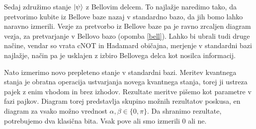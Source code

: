 \documentclass[mat1]{fmfdelo}
\begin{document}
Sedaj združimo stanje \(\ket{\psi}\) z Bellovim delcem. To najlažje naredimo tako, da pretvorimo kubite iz Bellove baze nazaj v standardno bazo, da jih bomo lahko naravno izmerili. Vezje za pretvorbo iz Bellove baze pa je ravno zrcaljen diagram vezja, za pretvarjanje v Bellovo bazo (opomba \ref{bell}). Lahko bi ubrali tudi druge načine, vendar so vrata \textsf{cNOT} in Hadamard običajna, merjenje v standardni bazi najlažje, način pa je usklajen z izbiro Bellovega delca kot nosilca informacij.
\begin{center}
\end{center}
Nato izmerimo novo prepleteno stanje v standardni bazi. Meritev kvantnega stanja je obratna operacija ustvarjanja novega kvantnega stanja, torej ji ustreza pajek z enim vhodom in brez izhodov. Rezultate meritve pišemo kot parametre v fazi pajkov. Diagram torej predstavlja skupino možnih rezultatov poskusa, en diagram za vsako možno vrednost \(\alpha,\beta\in\{0,\pi\}\). Da shranimo rezultate, potrebujemo dva klasična bita. Vsak pove ali smo izmerili \(0\) ali ne.
\end{document}
